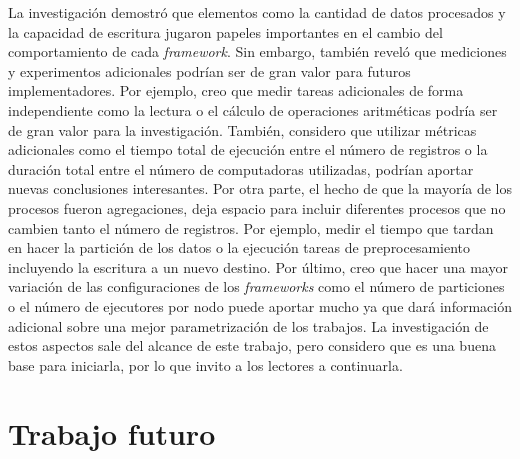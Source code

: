 La investigación demostró que elementos como la cantidad de datos procesados y la capacidad de escritura jugaron papeles importantes en el cambio del comportamiento de cada \textit{framework}. Sin embargo, también reveló que mediciones y experimentos adicionales podrían ser de gran valor para futuros implementadores. Por ejemplo, creo que medir tareas adicionales de forma independiente como la lectura o el cálculo de operaciones aritméticas podría ser de gran valor para la investigación. También, considero que utilizar métricas adicionales como el tiempo total de ejecución entre el número de registros o la duración total entre el número de computadoras utilizadas, podrían aportar nuevas conclusiones interesantes. Por otra parte, el hecho de que la mayoría de los procesos fueron agregaciones, deja espacio para incluir diferentes procesos que no cambien tanto el número de registros. Por ejemplo, medir el tiempo que tardan en hacer la partición de los datos o la ejecución tareas de preprocesamiento incluyendo la escritura a un nuevo destino. Por último, creo que hacer una mayor variación de las configuraciones de los \textit{frameworks} como el número de particiones o el número de ejecutores por nodo puede aportar mucho ya que dará información adicional sobre una mejor parametrización de los trabajos. La investigación de estos aspectos sale del alcance de este trabajo, pero considero que es una buena base para iniciarla, por lo que invito a los lectores a continuarla.

\section{Trabajo futuro}

